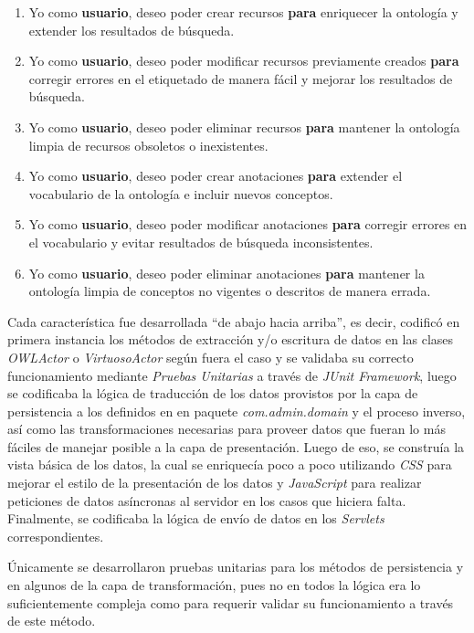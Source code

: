 \begin{itemize}
\begin{enumerate}
    \item Yo como \textbf{usuario}, deseo poder crear recursos \textbf{para} enriquecer la ontología y extender los resultados de búsqueda.
    \item Yo como \textbf{usuario}, deseo poder modificar recursos previamente creados \textbf{para} corregir errores en el etiquetado de manera fácil y mejorar los resultados de búsqueda.
    \item Yo como \textbf{usuario}, deseo poder eliminar recursos \textbf{para} mantener la ontología limpia de recursos obsoletos o inexistentes.
    \item Yo como \textbf{usuario}, deseo poder crear anotaciones \textbf{para} extender el vocabulario de la ontología e incluir nuevos conceptos.
    \item Yo como \textbf{usuario}, deseo poder modificar anotaciones \textbf{para} corregir errores en el vocabulario y evitar resultados de búsqueda inconsistentes.
    \item Yo como \textbf{usuario}, deseo poder eliminar anotaciones \textbf{para} mantener la ontología limpia de conceptos no vigentes o descritos de manera errada.
\end{enumerate}

Cada característica fue desarrollada ``de abajo hacia arriba'', es decir, codificó en primera instancia los métodos de extracción y/o escritura de datos en las clases \textit{OWLActor} o \textit{VirtuosoActor} según fuera el caso y se validaba su correcto funcionamiento mediante \textit{Pruebas Unitarias} a través de \textit{JUnit Framework}, luego se codificaba la lógica de traducción de los datos provistos por la capa de persistencia a los definidos en en paquete \textit{com.admin.domain} y el proceso inverso, así como las transformaciones necesarias para proveer datos que fueran lo más fáciles de manejar posible a la capa de presentación. Luego de eso, se construía la vista básica de los datos, la cual se enriquecía poco a poco utilizando \textit{CSS} para mejorar el estilo de la presentación de los datos y \textit{JavaScript} para realizar peticiones de datos asíncronas al servidor en los casos que hiciera falta. Finalmente, se codificaba la lógica de envío de datos en los \textit{Servlets} correspondientes.

Únicamente se desarrollaron pruebas unitarias para los métodos de persistencia y en algunos de la capa de transformación, pues no en todos la lógica era lo suficientemente compleja como para requerir validar su funcionamiento a través de este método.


\end{itemize}
